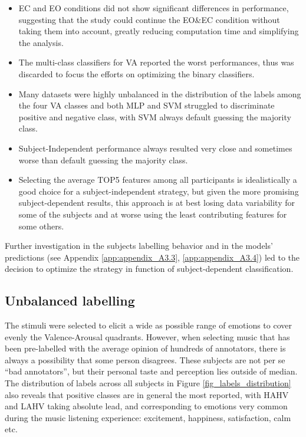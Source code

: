\begin{itemize}
\item 	\ac{EC} and \ac{EO} conditions did not show significant differences in performance, suggesting that the study could continue the EO\&EC condition without taking them into account, greatly reducing computation time and simplifying the analysis.
\item 	The multi-class classifiers for \ac{VA} reported the worst performances, thus was discarded to focus the efforts on optimizing the binary classifiers.
\item 	Many datasets were highly unbalanced in the distribution of the labels among the four \ac{VA} classes and both \ac{MLP} and \ac{SVM} struggled to discriminate positive and negative class, with \ac{SVM} always default guessing the majority class.
\item 	Subject-Independent performance always resulted very close and sometimes worse than default guessing the majority class.
\item 	Selecting the average TOP5 features among all participants is idealistically a good choice for a subject-independent strategy, but given the more promising subject-dependent results, this approach is at best losing data variability for some of the subjects and at worse using the least contributing features for some others.
\end{itemize}

Further investigation in the subjects labelling behavior and in the models’ predictions (see Appendix \ref{app:appendix_A3.3}, \ref{app:appendix_A3.4}) led to the decision to optimize the strategy in function of subject-dependent classification.

\subsection{Unbalanced labelling}
\label{sec:unbalanced_labelling}
The stimuli were selected to elicit a wide as possible range of emotions to cover evenly the Valence-Arousal quadrants. However, when selecting music that has been pre-labelled with the average opinion of hundreds of annotators, there is always a possibility that some person disagrees. These subjects are not per se “bad annotators”, but their personal taste and perception lies outside of median. The distribution of labels across all subjects in Figure \ref{fig_labels_distribution} also reveals that positive classes are in general the most reported, with HAHV and LAHV taking absolute lead, and corresponding to emotions very common during the music listening experience: excitement, happiness, satisfaction, calm etc.

